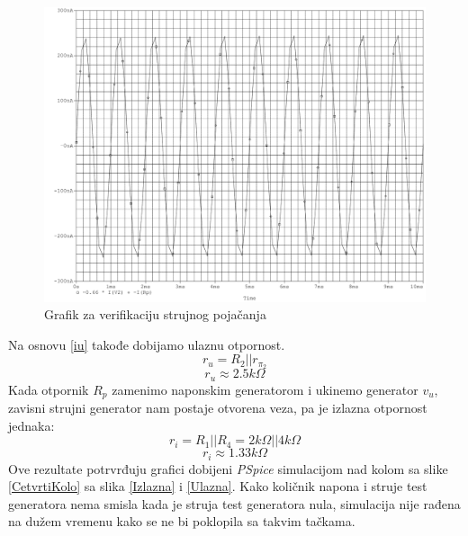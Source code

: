 \documentclass{article}
\begin{document}
            \begin{figure}[H]
                \centering
                \includegraphics[width=\textwidth,height=\textheight,keepaspectratio]{Strujno.pdf}
                \caption{Grafik za verifikaciju strujnog pojačanja}
                \label{Strujno}
            \end{figure}
            Na osnovu \eqref{iu} takođe dobijamo ulaznu otpornost.
            $$r_u = R_2 || r_{\pi_2}$$
            $$\boxed{r_u \approx 2.5k\Omega}$$
            Kada otpornik $R_p$ zamenimo naponskim generatorom i ukinemo generator $v_u$, zavisni strujni generator nam postaje otvorena veza, pa je izlazna otpornost jednaka:
            $$r_i = R_1 || R_4 = 2k\Omega || 4k\Omega$$
            $$\boxed{r_i \approx 1.33k\Omega}$$
            Ove rezultate potrvrđuju grafici dobijeni \textit{PSpice} simulacijom nad kolom sa slike \ref{CetvrtiKolo} sa slika \ref{Izlazna} i \ref{Ulazna}. Kako količnik napona i struje test generatora nema smisla kada je struja test generatora nula, simulacija nije rađena na dužem vremenu kako se ne bi poklopila sa takvim tačkama.
\end{document}
